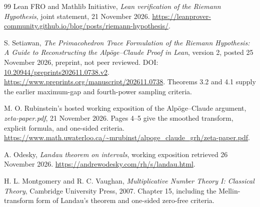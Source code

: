 \documentclass[11pt,a4paper]{article}
\theoremstyle{definition}
\theoremstyle{remark}
\numberwithin{equation}{section}
\begin{document}
\begin{thebibliography}{99}
Lean FRO and Mathlib Initiative,
\emph{Lean verification of the Riemann Hypothesis},
joint statement, 21 November 2026.
\url{https://leanprover-community.github.io/blog/posts/riemann-hypothesis/}.

S. Setiawan,
\emph{The Primacohedron Trace Formulation of the Riemann Hypothesis:
A Guide to Reconstructing the Alp\"oge--Claude Proof in Lean},
version 2, posted 25 November 2026, preprint, not peer reviewed.
DOI: \href{https://doi.org/10.20944/preprints202611.0738.v2}
{10.20944/preprints202611.0738.v2}.
\url{https://www.preprints.org/manuscript/202611.0738}.
Theorems 3.2 and 4.1 supply the earlier maximum-gap and fourth-power
sampling criteria.

M. O. Rubinstein's hosted working exposition of the Alp\"oge--Claude
argument, \emph{zeta-paper.pdf}, 21 November 2026.
Pages 4--5 give the smoothed transform, explicit formula, and
one-sided criteria.
\url{https://www.math.uwaterloo.ca/~mrubinst/alpoge_claude_grh/zeta-paper.pdf}.

A. Odesky, \emph{Landau theorem on intervals},
working exposition retrieved 26 November 2026.
\url{https://andrewodesky.com/rh/s/landau.html}.

H. L. Montgomery and R. C. Vaughan,
\emph{Multiplicative Number Theory I: Classical Theory},
Cambridge University Press, 2007.
Chapter 15, including the Mellin-transform form of Landau's theorem
and one-sided zero-free criteria.
\end{thebibliography}
\end{document}
